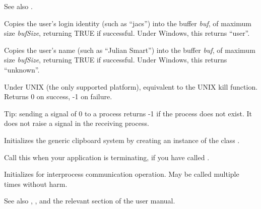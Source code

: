 See also .



Copies the user's login identity (such as ``jacs'') into the buffer {\it
buf}, of maximum size {\it bufSize}, returning TRUE if successful.
Under Windows, this returns ``user''.



Copies the user's name (such as ``Julian Smart'') into the buffer {\it
buf}, of maximum size {\it bufSize}, returning TRUE if successful.
Under Windows, this returns ``unknown''.

\label{wxkill}


Under UNIX (the only supported platform), equivalent to the UNIX kill function.
Returns 0 on success, -1 on failure.

Tip: sending a signal of 0 to a process returns -1 if the process does not exist.
It does not raise a signal in the receiving process.

\label{wxinitclipboard}


Initializes the generic clipboard system by creating an instance of
the class .

\label{wxipccleanup}


Call this when your application is terminating, if you have
called .

\label{wxipcinitialize}


Initializes for interprocess communication operation. May
be called multiple times without harm.

See also , , 
and the relevant section of the user manual.

\label{wxisbusy}

